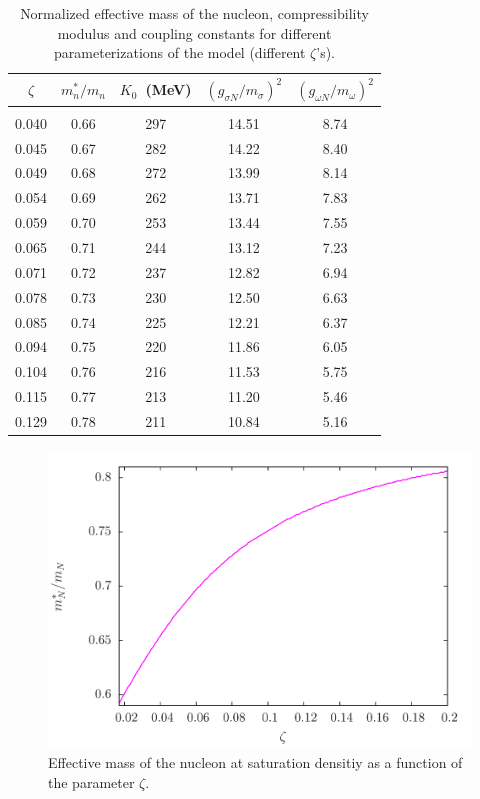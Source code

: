\documentclass[twocolumn,showpacs,aps]{revtex4}
\begin{document}
\begin{table}[t]
  \caption{\label{table:Table_coupling} Normalized effective mass of the nucleon, compressibility modulus
  and coupling constants for different parameterizations of the model (different $\zeta$'s).}
\begin{ruledtabular}
\begin{tabular}{ccccc}
$\zeta$ & $m^*_n/m_n$ &  $K_0$~(MeV) & $(g_{\sigma N}/m_{\sigma})^2$ & $(g_{\omega N}/m_{\omega})^2$  \\
  \hline
    &  &  &  &  \\
  0.040 & 0.66 & 297  & 14.51  & 8.74 \\ 
  0.045 & 0.67 & 282  & 14.22  & 8.40 \\ 
  0.049 & 0.68 & 272  & 13.99  & 8.14 \\    
  0.054 & 0.69 & 262  & 13.71  & 7.83 \\ 
  0.059 & 0.70 & 253  & 13.44  & 7.55 \\
  0.065 & 0.71 & 244  & 13.12  & 7.23 \\ 
  0.071 & 0.72 & 237  & 12.82  & 6.94 \\ 
  0.078 & 0.73 & 230  & 12.50  & 6.63 \\ 
  0.085 & 0.74 & 225  & 12.21  & 6.37 \\ 
  0.094 & 0.75 & 220  & 11.86  & 6.05 \\ 
  0.104 & 0.76 & 216  & 11.53  & 5.75 \\ 
  0.115 & 0.77 & 213  & 11.20  & 5.46 \\ 
  0.129 & 0.78 & 211  & 10.84  & 5.16 \\ 
  \end{tabular}
\end{ruledtabular}
\end{table}

  
  
 \begin{figure}
 \centering
 \vspace{1.0cm}
 \includegraphics[width=9.cm]{meff_lambda.png}
 \caption{\label{meff_lambda} Effective mass of the nucleon at saturation densitiy as a function of the parameter $\zeta$.}
 \end{figure}
 
\end{document}
